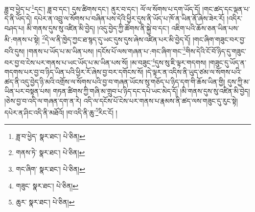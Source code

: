 ཟླ་བ་ཕྱེད་པ་\footnote{ཟླ་བ་ཕྱེད་  སྣར་ཐང་།  པེ་ཅིན། }དང་། ཟླ་བ་དང་། དུས་ཚིགས་དང་། ནུར་བ་དང་། ལོ་ལ་སོགས་པ་དག་ཡོད་དོ། །གང་ཚད་དང་ལྡན་པ་དེ་ནི་ཡོད་དེ། དཔེར་ན་འབྲུ་ལ་སོགས་པ་བཞིན་པས་དེའི་ཕྱིར་དུས་ནི་ཡོད་པ་ཁོ་ན་ཡིན་ནོ་ཞེས་ཟེར་རོ། །འདིར་བཤད་པ། མི་གནས་དུས་སུ་འཛིན་མི་བྱེད། །འདུ་བྱེད་ཀྱི་ཚོགས་ནི་སྐྱེ་བ་དང་། འཇིག་པའི་ཆོས་ཅན་ཡིན་པས་མི་:གནས་པ་སྟེ། \footnote{གནས་ཏེ་  སྣར་ཐང་།  པེ་ཅིན། }དེ་ལ་ནི་ཁྱེད་ཀྱང་ཐ་སྙད་དུ་ཡང་དུས་དུས་ཞེས་འཛིན་པར་མི་བྱེད་དོ། །གང་ཞིག་གཟུང་བར་བྱ་བའི་དུས། །གནས་པ་ཡོད་པ་མ་ཡིན་པས། །དངོས་པོ་ལས་གཞན་པ་:གང་ཞིག་གང་\footnote{གང་ཞིག་  སྣར་ཐང་།  པེ་ཅིན། }གིས་དེའི་ངོ་བོ་ཉིད་དུ་གཟུང་བར་བྱ་བ་ངེས་པར་གནས་པ་ཡང་ཡོད་པ་མ་ཡིན་པས་སོ། །མ་བཟུང་\footnote{གཟུང་  སྣར་ཐང་།  པེ་ཅིན། }དུས་སུ་ཇི་ལྟར་གདགས། །གཟུང་དུ་ཡོད་ན་གདགས་པར་བྱ་བ་ཉིད་ཡིན་པའི་ཕྱིར་རོ་ཞེས་བྱ་བར་དགོངས་སོ། །དེ་ལྟར་ན་འདིས་ནི་ཡུད་ཙམ་ལ་སོགས་པའི་ཚད་ནི་འདུ་བྱེད་ཉི་མའི་འགྲོས་ལ་སོགས་པའི་བྱ་བ་གཞན་ཡོངས་སུ་གཅོད་པ་ཉིད་དག་གི་ཆོས་ཡིན་གྱི། དུས་ཀྱི་མ་ཡིན་པར་བསྟན་པས། གཏན་ཚིགས་ཀྱི་གཞི་མ་གྲུབ་པ་ཉིད་དང་དཔེ་ཡང་མེད་དོ། །མི་གནས་དུས་སུ་འཛིན་མི་བྱེད། །ཅེས་བྱ་བ་འདི་ལ་གཞན་དག་ན་རེ། འདི་ལ་དངོས་པོ་ངེས་པར་གནས་པ་རྣམས་ནི་ཚད་ལས་གཟུང་དུ་རུང་སྟེ། དཔེར་ན་ཤིང་འདི་ནི་མཐོའོ། །བ་འདི་ནི་ཆུ་\footnote{ཆུར་  སྣར་ཐང་།  པེ་ཅིན། }རིང་ངོ། །
